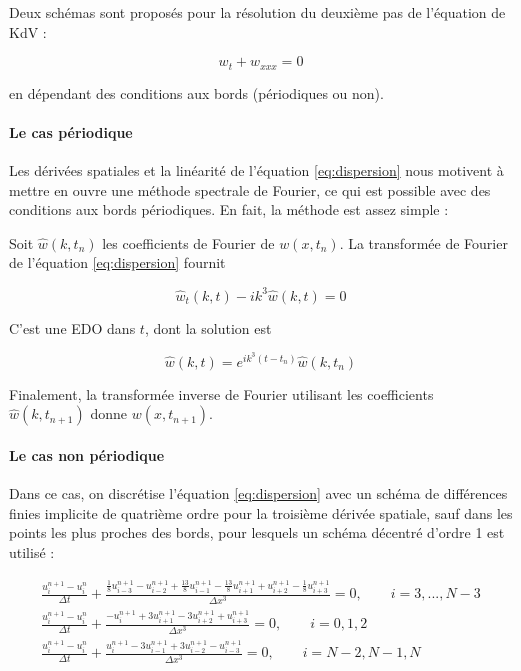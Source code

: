 \indent Deux schémas sont proposés pour la résolution du deuxième pas de l'équation de KdV :

\begin{equation}
	\label{eq:dispersion}
	w_t + w_{xxx} = 0
\end{equation}

\noindent en dépendant des conditions aux bords (périodiques ou non).

\paragraph{Le cas périodique}

\indent Les dérivées spatiales et la linéarité de l'équation \eqref{eq:dispersion} nous motivent à mettre en ouvre une méthode spectrale de Fourier, ce qui est possible avec des conditions aux bords périodiques. En fait, la méthode est assez simple :

\indent Soit $\hat{w}(k,t_n)$  les coefficients de Fourier de $w(x,t_n)$. La transformée de Fourier de l'équation \eqref{eq:dispersion} fournit

\begin{equation*}
	\hat{w}_t(k,t) - ik^3\hat{w}(k,t) = 0
\end{equation*}

\indent C'est une EDO dans $t$, dont la solution est

\begin{equation*}
\hat{w}(k,t) = e^{ik^3(t-t_n)}\hat{w}(k,t_n)
\end{equation*}

\indent Finalement, la transformée inverse de Fourier utilisant les coefficients $\hat{w}(k,t_{n+1})$ donne $w(x,t_{n+1})$.

\paragraph{Le cas non périodique}

\indent Dans ce cas, on discrétise l'équation \eqref{eq:dispersion} avec un schéma de différences finies implicite de quatrième ordre pour la troisième dérivée spatiale, sauf dans les points les plus proches des bords, pour lesquels un schéma décentré  d'ordre 1 est utilisé :

\begin{equation*}
\begin{gathered}
	\frac{u_i^{n+1} - u_i^n}{\Delta t} + \frac{\frac{1}{8}u_{i-3}^{n+1} - u_{i-2}^{n+1}  + \frac{13}{8}u_{i-1}^{n+1} - \frac{13}{8}u_{i+1}^{n+1} + u_{i+2}^{n+1} - \frac{1}{8}u_{i+3}^{n+1}}{\Delta x^3} = 0, \qquad i = 3,...,N-3 \\
	\frac{u_i^{n+1} - u_i^n}{\Delta t}  + \frac{-u_{i}^{n+1} + 3u_{i+1}^{n+1}  -3 u_{i+2}^{n+1} + u_{i+3}^{n+1} }{\Delta x^3} = 0, \qquad i = 0,1,2 \\
	\frac{u_i^{n+1} - u_i^n}{\Delta t}  + \frac{u_{i}^{n+1} - 3u_{i-1}^{n+1}  + 3 u_{i-2}^{n+1} - u_{i-3}^{n+1} }{\Delta x^3} = 0, \qquad i = N-2,N-1,N 
\end{gathered} 
\end{equation*}

